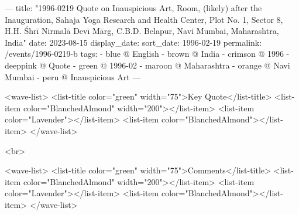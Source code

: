 ---
title: "1996-0219 Quote on Inauspicious Art, Room, (likely) after the Inauguration, Sahaja Yoga Research and Health Center, Plot No. 1, Sector 8, H.H. Śhrī Nirmalā Devī Mārg, C.B.D. Belapur, Navi Mumbai, Maharashtra, India"
date: 2023-08-15
display_date: 
sort_date: 1996-02-19
permalink: /events/1996-0219-b
tags:
  - blue @ English
  - brown @ India
  - crimson @ 1996
  - deeppink @ Quote
  - green @ 1996-02
  - maroon @ Maharashtra
  - orange @ Navi Mumbai
  - peru @ Inauspicious Art
---

<wave-list>
  <list-title color="green" width="75">Key Quote</list-title>
  <list-item color="BlanchedAlmond"  width="200"></list-item>
  <list-item color="Lavender"></list-item>
  <list-item color="BlanchedAlmond"></list-item>
</wave-list>

<br>

<wave-list>
  <list-title color="green" width="75">Comments</list-title>
  <list-item color="BlanchedAlmond"  width="200"></list-item>
  <list-item color="Lavender"></list-item>
  <list-item color="BlanchedAlmond"></list-item>
</wave-list>